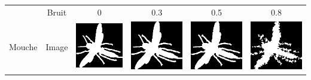 \documentclass{article}
\theoremstyle{definition}
\begin{document}
	  \begin{table}[!h] %
	  \centering
	  \begin{tabular}{|c|c|c|c|c|c|}
	    \hline
	    & Bruit & 0 & 0.3 & 0.5 & 0.8 \\
	    \cline{2-6}
	    Mouche & Image & \includegraphics[scale=0.15]{Illustrations/fly-6-debruite.png} & \includegraphics[scale=0.15]{Illustrations/fly-6-debruite(3).png} & \includegraphics[scale=0.15]{Illustrations/fly-6-debruite(5).png} & \includegraphics[scale=0.15]{Illustrations/fly-6-debruite(8).png} \\

\end{tabular}
\end{table}
\end{document}
